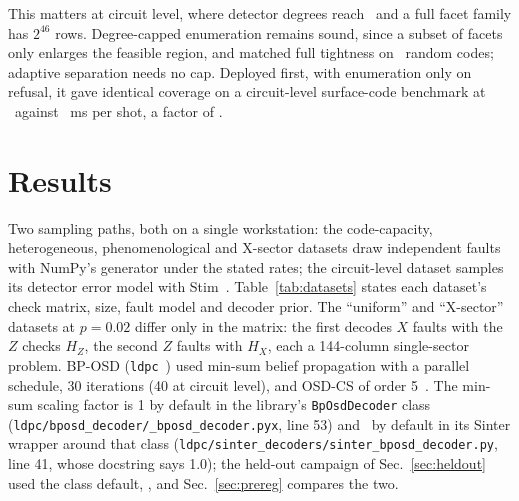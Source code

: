 \documentclass[aps,pra,twocolumn,superscriptaddress,nofootinbib,longbibliography,floatfix]{revtex4-2}
\begin{document}
This matters at circuit level, where detector degrees reach \SurfaceDegreeMax\ and a full facet family has $2^{46}$ rows. Degree-capped enumeration remains sound, since a subset of facets only enlarges the feasible region, and matched full tightness on \EnsCappedTight\ random codes; adaptive separation needs no cap. Deployed first, with enumeration only on refusal, it gave identical coverage on a circuit-level surface-code benchmark at \TieredMs\ against \EnumMs\ ms per shot, a factor of \TieredSpeedup.

\section{Results}
\label{sec:results}

Two sampling paths, both on a single workstation: the code-capacity, heterogeneous, phenomenological and X-sector datasets draw independent faults with NumPy's generator under the stated rates; the circuit-level dataset samples its detector error model with Stim~\cite{gidney2021stim}. Table~\ref{tab:datasets} states each dataset's check matrix, size, fault model and decoder prior. The ``uniform'' and ``X-sector'' datasets at $p=0.02$ differ only in the matrix: the first decodes $X$ faults with the $Z$ checks $H_Z$, the second $Z$ faults with $H_X$, each a 144-column single-sector problem. BP-OSD (\texttt{ldpc}~\LdpcVersion) used min-sum belief propagation with a parallel schedule, 30 iterations (40 at circuit level), and OSD-CS of order 5~\cite{roffe2020decoding}. The min-sum scaling factor is 1 by default in the library's \texttt{BpOsdDecoder} class (\nolinkurl{ldpc/bposd_decoder/_bposd_decoder.pyx}, line 53) and \ScaledAlpha\ by default in its Sinter wrapper around that class (\nolinkurl{ldpc/sinter_decoders/sinter_bposd_decoder.py}, line 41, whose docstring says 1.0); the held-out campaign of Sec.~\ref{sec:heldout} used the class default, \LdpcClassAlpha, and Sec.~\ref{sec:prereg} compares the two.

\begin{table}[tbp]
\caption{The datasets. Rows and columns of the check matrix as persisted (hash-bound) in the release; the phenomenological matrix stacks four noisy rounds and one perfect round (576 data and 288 measurement mechanisms), the circuit one is the detector error model of the published depth-8 cycle over three rounds of memory-$Z$ with one declared observable. Prior: the decoder's channel. Objective: unit weights, or the published integer weights.}
\label{tab:datasets}
\small\setlength{\tabcolsep}{4pt}

\end{table}
\end{document}
